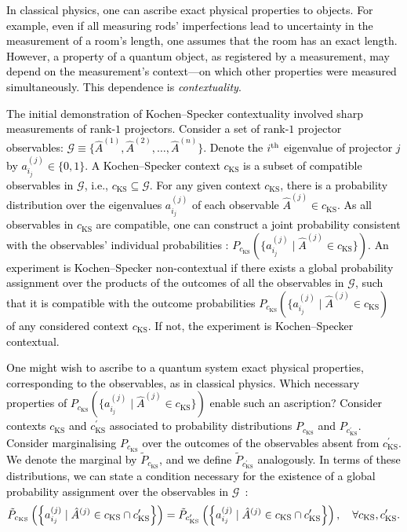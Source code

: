 \documentclass[%
 reprint,
superscriptaddress,
nofootinbib,
bibnotes,
 amsmath,amssymb,
 aps,
]{revtex4-1}
\theoremstyle{plain}
\newcommand{\Dave}[1]{\textcolor{black}{#1} }
\newcommand{\nicole}[1]{\textcolor{black}{#1} }
\begin{document}
\nicole{
In classical physics, 
one can ascribe exact physical properties to objects. 
For example, even if all measuring rods' imperfections lead to uncertainty in the measurement of a room's length, one assumes that the room has an exact length.
However, a property of a quantum object,
as registered by a measurement, may depend on the 
measurement's context---on which other properties were measured simultaneously.  This dependence is \emph{contextuality}. 
}

\Dave{
The initial demonstration of Kochen--Specker contextuality involved sharp measurements of rank-$1$ projectors.  Consider a set of rank-$1$ projector observables:  
$\mathcal{G} \equiv \{  \hat{A}^{(1)},  \hat{A}^{(2)}, \ldots,  \hat{A}^{(n)} \}$. 
\nicole{Denote the $i^{\rm th}$ eigenvalue of projector $j$ by $a_{i_j}^{(j)}  \in  \{0, 1 \}$.} 
A Kochen--Specker context $c_{\mathrm{KS}}$ is a subset of compatible observables in $\mathcal{G}$, i.e., $c_{\mathrm{KS}} \subseteq \mathcal{G}$.  
\Dave{For any given context $c_{\mathrm{KS}}$,  there is a probability distribution over the 
eigenvalues $a_{i_j}^{(j)}$
of each observable $\hat{A}^{(j)} \in c_{\mathrm{KS}}$.}   
\Dave{As all observables in $c_{\mathrm{KS}}$ are compatible,} one \Dave{can construct} a joint probability \nicole{consistent with the observables' individual probabilities}: 
$P_{c_{\mathrm{KS}}} \left( \{ a^{(j)}_{i_j} \; | \; \hat{A}^{(j)} \in c_{\mathrm{KS}}  \} \right)$. } \Dave{An experiment is Kochen--Specker non-contextual if there exists a global probability assignment over the products of the outcomes of all  the observables in $\mathcal{G}$, such that it is compatible with the outcome probabilities $P_{c_{\mathrm{KS}}} ( \{ a^{(j)}_{i_j} \; | \; \hat{A}^{(j)} \in c_{\mathrm{KS}} )$ of any considered context $c_{\mathrm{KS}}$. If not, the experiment is Kochen--Specker contextual.}


\nicole{One might wish to ascribe to a quantum system exact physical properties, corresponding to the observables, as in classical physics. Which necessary properties of $P_{c_{\mathrm{KS}}}\left( \{ a^{(j)}_{i_j} \; | \; \hat{A}^{(j)} \in c_{\mathrm{KS}}  \} \right)$ enable such an ascription?}
\nicole{Consider contexts $c_{\mathrm{KS}}$ and $c_{\mathrm{KS}}^{\prime}$ associated to probability distributions $P_{c_{\mathrm{KS}}}$ and $P_{c^{\prime}_{\mathrm{KS}}}$.
Consider marginalising $P_{c_{\mathrm{KS}}}$  over the outcomes of the observables absent from $c_{\mathrm{KS}}^{\prime}$.  We denote the marginal by 
$\tilde{P}_{c_{\mathrm{KS}}} $, and we define
$\tilde{P}_{c_{\mathrm{KS}}^{\prime}} $ analogously.
\nicole{In terms of these distributions, we can state a condition necessary for the existence of a global probability assignment over the observables in $\mathcal{G}$~\cite{Abramsky_2011}:}
\begin{equation}
\tilde{P}_{c_{\mathrm{KS}}} \left(  \left\{ a_{i_j}^{(j)} \; | \; \hat{A}^{(j)} \in c_{\mathrm{KS}} \cap c_{\mathrm{KS}}^{\prime}  \right\}  \right) 
= \tilde{P}_{c^{\prime}_{\mathrm{KS}}}  \left(  \left\{ a_{i_j}^{(j)} \; | \; \hat{A}^{(j)} \in c_{\mathrm{KS}} \cap c_{\mathrm{KS}}^{\prime}  \right\}  \right) , \quad \Dave{\forall c_{\mathrm{KS}}, c_{\mathrm{KS}}^{\prime}} .
\end{equation}
}
\end{document}
